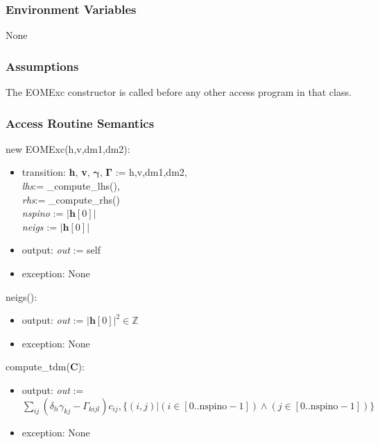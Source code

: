 \documentclass[12pt, titlepage]{article}
\begin{document}
\subsubsection{Environment Variables}

None

\subsubsection{Assumptions}

The EOMExc constructor is called before any other access program in that class.

\subsubsection{Access Routine Semantics}

\noindent new EOMExc(h,v,dm1,dm2):
\begin{itemize}
	\item transition: \textbf{h}, \textbf{v}, $\boldsymbol{\gamma}$, 
	$\boldsymbol{\Gamma}$ := h,v,dm1,dm2,\\ \textit{lhs}:= \_compute\_lhs(),\\ 
	\textit{rhs}:= \_compute\_rhs()\\
	\textit{nspino} := $|\boldsymbol{h}[0]|$\\
	\textit{neigs} := $|\boldsymbol{h}[0]|$
	\item output: \textit{out} := self 
	\item exception: None
\end{itemize}

neigs():
\begin{itemize}
	\item output: \textit{out} := $|\boldsymbol{h}[0]|^2 \in \mathbb{Z}$
	\item exception: None
\end{itemize}

\noindent compute\_tdm(\textbf{C}):
\begin{itemize}
	\item output: \textit{out} := $\sum_{ij}(\delta_{li}\gamma_{kj} - 
	\Gamma_{kijl}) c_{ij}, \{(i,j)|(i\in [0..\text{nspino}-1]) \land (j\in 
	[0..\text{nspino}-1])\}$
	\item exception: None
\end{itemize}
\end{document}
